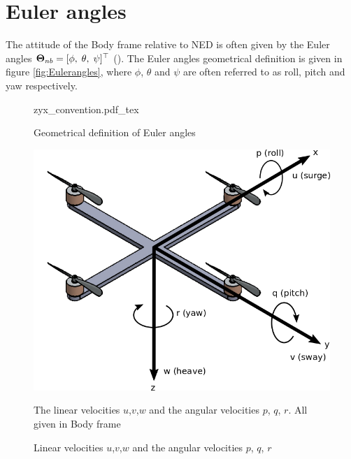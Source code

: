 \section{Euler angles}\label{sec:euler}
The attitude of the Body frame relative to NED is often given by the Euler angles $\boldsymbol{\Theta}_{nb}=[\phi, \; \theta, \; \psi]^\top$ (\cite{Fossen2011}). The Euler angles geometrical definition is given in figure \ref{fig:Eulerangles}, where $\phi$, $\theta$ and $\psi$ are often referred to as roll, pitch and yaw respectively.
\begin{figure}[!htp]
  \begin{minipage}[b]{0.5\linewidth}
    \centering
    \def\svgwidth{\linewidth}%
    {zyx_convention.pdf_tex}
    \caption{Geometrical definition of Euler angles}
    \label{fig:Eulerangles}
  \end{minipage}
  \hspace{0.5cm}
  \begin{minipage}[b]{0.5\linewidth}
    \centering
    \includegraphics[width=\linewidth]{img/simpleQuadEuler.png}
    \caption{Linear velocities $u$,$v$,$w$ and the angular velocities $p$, $q$, $r$}{The linear velocities $u$,$v$,$w$ and the angular velocities $p$, $q$, $r$. All given in Body frame}
    \label{fig:quadEuler}
  \end{minipage}
\end{figure}

